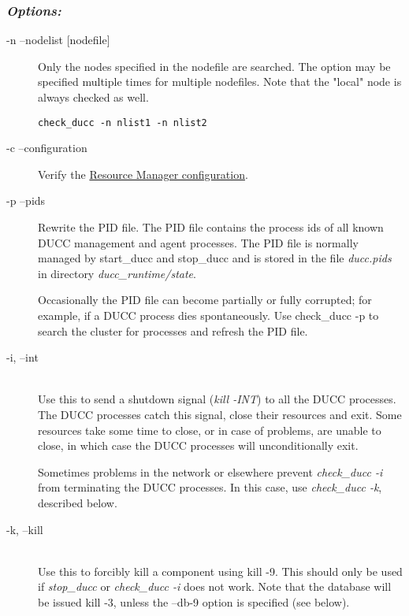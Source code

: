      \subsubsection{\em{Options:}}
         \begin{description}
           \item[-n --nodelist {[nodefile]}]
             Only the nodes specified in the nodefile are searched. The option may be specified 
             multiple times for multiple nodefiles. Note that the "local" node is always checked as well. 
\begin{verbatim}
check_ducc -n nlist1 -n nlist2 
\end{verbatim}
                       
           \item[-c --configuration]
             Verify the \hyperref[sec:ducc.classes]{Resource Manager configuration}.

           \item[-p --pids]               
               Rewrite the PID file. The PID file contains the process ids of all known DUCC 
               management and agent processes. The PID file is normally managed by start\_ducc and 
               stop\_ducc and is stored in the file {\em ducc.pids} in directory {\em ducc\_runtime/state}.
               
               Occasionally the PID file can become partially or fully corrupted; for example, if a DUCC 
               process dies spontaneously. Use check\_ducc -p to search the cluster for processes and 
               refresh the PID file. 
               
            \item[-i, --int] \hfill \\
              Use this to send a shutdown signal ({\em kill -INT}) to all the DUCC processes.  The DUCC processes
              catch this signal, close their resources and exit.  Some resources take some time to close, or in
              case of problems, are unable to close, in which case the DUCC processes will unconditionally exit.

              Sometimes problems in the network or elsewhere prevent {\em check\_ducc -i} from terminating
              the DUCC processes.  In this case, use {\em check\_ducc -k}, described below.

            \item[-k, --kill] \hfill \\
              Use this to forcibly kill a component using kill -9. This should only be used if {\em stop\_ducc}
              or {\em check\_ducc -i} does not work.  Note that the database will be issued kill -3, unless
              the --db-9 option is specified (see below).


\end{description}
